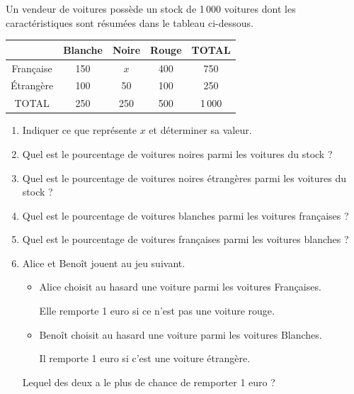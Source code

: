 Un vendeur de voitures possède un stock de 1\,000 voitures dont les caractéristiques sont résumées dans le tableau ci-dessous.

\begin{center}
\begin{tabular}{|c|c|c|c|c|}
\hline
 & Blanche & Noire & Rouge & TOTAL \\
\hline
Française & 150 & $x$ & 400 & 750 \\
\hline
Étrangère & 100 & 50 & 100 & 250 \\
\hline
TOTAL & 250 & 250 & 500 & 1\,000 \\
\hline
\end{tabular}
\end{center}

\begin{enumerate}
\item Indiquer ce que représente $x$ et déterminer sa valeur.
\item Quel est le pourcentage de voitures noires parmi les voitures du stock ?
\item Quel est le pourcentage de voitures noires étrangères parmi les voitures du stock ?
\item Quel est le pourcentage de voitures blanches parmi les voitures françaises ?
\item Quel est le pourcentage de voitures françaises parmi les voitures blanches ?
\item Alice et Benoît jouent au jeu suivant.
\begin{itemize}
\item Alice choisit au hasard une voiture parmi les voitures Françaises.

Elle remporte 1 euro si ce n'est pas une voiture rouge.
\item Benoît choisit au hasard une voiture parmi les voitures Blanches.

Il remporte 1 euro si c'est une voiture étrangère.
\end{itemize}
Lequel des deux a le plus de chance de remporter 1 euro ?
\end{enumerate}


\bigskip
